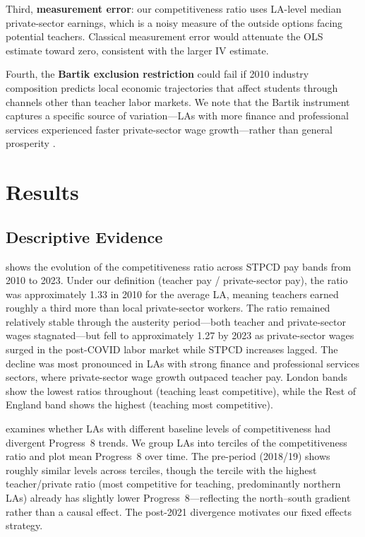\documentclass[12pt]{article}
\begin{document}
Third, \textbf{measurement error}: our competitiveness ratio uses LA-level median private-sector earnings, which is a noisy measure of the outside options facing potential teachers. Classical measurement error would attenuate the OLS estimate toward zero, consistent with the larger IV estimate.

Fourth, the \textbf{Bartik exclusion restriction} could fail if 2010 industry composition predicts local economic trajectories that affect students through channels other than teacher labor markets. We note that the Bartik instrument captures a specific source of variation---LAs with more finance and professional services experienced faster private-sector wage growth---rather than general prosperity \citep{goldsmith2020bartik}.


\section{Results}

\subsection{Descriptive Evidence}

 shows the evolution of the competitiveness ratio across STPCD pay bands from 2010 to 2023. Under our definition (teacher pay / private-sector pay), the ratio was approximately 1.33 in 2010 for the average LA, meaning teachers earned roughly a third more than local private-sector workers. The ratio remained relatively stable through the austerity period---both teacher and private-sector wages stagnated---but fell to approximately 1.27 by 2023 as private-sector wages surged in the post-COVID labor market while STPCD increases lagged. The decline was most pronounced in LAs with strong finance and professional services sectors, where private-sector wage growth outpaced teacher pay. London bands show the lowest ratios throughout (teaching least competitive), while the Rest of England band shows the highest (teaching most competitive).

 examines whether LAs with different baseline levels of competitiveness had divergent Progress~8 trends. We group LAs into terciles of the competitiveness ratio and plot mean Progress~8 over time. The pre-period (2018/19) shows roughly similar levels across terciles, though the tercile with the highest teacher/private ratio (most competitive for teaching, predominantly northern LAs) already has slightly lower Progress~8---reflecting the north--south gradient rather than a causal effect. The post-2021 divergence motivates our fixed effects strategy.
\end{document}
